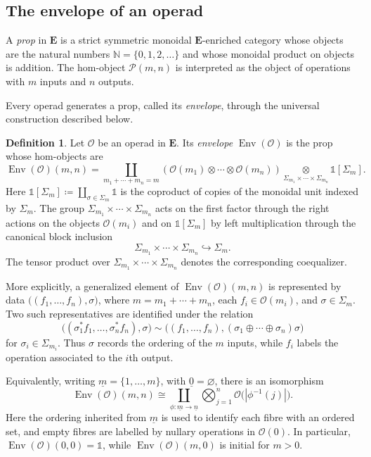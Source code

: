 \documentclass{amsart}
\newcommand{\bE}{\mathbf{E}}
\newcommand{\calO}{\mathcal{O}}
\newcommand{\calP}{\mathcal{P}}
\newcommand{\Env}{\operatorname{Env}}
\theoremstyle{definition}
\newtheorem{definition}[theorem]{Definition}%
\numberwithin{equation}{section}
\begin{document}
\subsection{The envelope of an operad}
\label{subsec: Envelop and Props}

A \emph{prop} in $\bE$ is a strict symmetric monoidal
$\bE$-enriched category whose objects are the natural numbers
$\mathbb{N}=\{0,1,2,\ldots\}$ and whose monoidal product on objects
is addition. The hom-object $\calP(m,n)$ is interpreted as the object
of operations with $m$ inputs and $n$ outputs.

Every operad generates a prop, called its \emph{envelope}, through the universal construction described below.

\begin{definition}
\label{def: envelope}
Let $\calO$ be an operad in $\bE$. Its \emph{envelope} $\Env(\calO)$ is the prop whose hom-objects are
\begin{equation}
\label{eq:envelope}
\Env(\calO)(m,n)
=
\coprod_{m_1+\cdots+m_n=m}
\left(
\calO(m_1)\otimes\cdots\otimes\calO(m_n)
\right)
\underset{\Sigma_{m_1}\times\cdots\times\Sigma_{m_n}}{\otimes}
\mathbb{1}[\Sigma_m].
\end{equation}
Here $\mathbb{1}[\Sigma_m]\coloneqq \coprod_{\sigma\in\Sigma_m}\mathbb{1}$ is the coproduct of copies of the monoidal unit indexed by $\Sigma_m$. The group
$\Sigma_{m_1}\times\cdots\times\Sigma_{m_n}$ acts on the first factor through the right actions on the objects $\calO(m_i)$ and on $\mathbb{1}[\Sigma_m]$ by left multiplication through the canonical block inclusion
\[
\Sigma_{m_1}\times\cdots\times\Sigma_{m_n}
\hookrightarrow\Sigma_m.
\]
The tensor product over
$\Sigma_{m_1}\times\cdots\times\Sigma_{m_n}$ denotes the corresponding coequalizer.
\end{definition}

More explicitly, a generalized element of
$\Env(\calO)(m,n)$ is represented by data
$\bigl((f_1,\ldots,f_n),\sigma\bigr)$, where
$m=m_1+\cdots+m_n$, each $f_i\in\calO(m_i)$, and
$\sigma\in\Sigma_m$. Two such representatives are identified under
the relation
\[
\bigl((\sigma_1^*f_1,\ldots,\sigma_n^*f_n),\sigma\bigr)
\sim
\bigl((f_1,\ldots,f_n),
(\sigma_1\oplus\cdots\oplus\sigma_n)\sigma\bigr)
\]
for $\sigma_i\in\Sigma_{m_i}$. Thus $\sigma$ records the ordering of
the $m$ inputs, while $f_i$ labels the operation associated to the
$i$th output.

Equivalently, writing $\underline m=\{1,\ldots,m\}$, with
$\underline0=\varnothing$, there is an isomorphism
\[
\Env(\calO)(m,n)
\cong
\coprod_{\phi\colon\underline m\to\underline n}
\bigotimes_{j=1}^n
\calO\bigl(|\phi^{-1}(j)|\bigr).
\]
Here the ordering inherited from $\underline m$ is used to identify each fibre with an ordered set, and empty fibres are labelled by nullary operations in $\calO(0)$. In particular, $\Env(\calO)(0,0)=\mathbb{1}$, while $\Env(\calO)(m,0)$ is initial for $m>0$.
\end{document}
